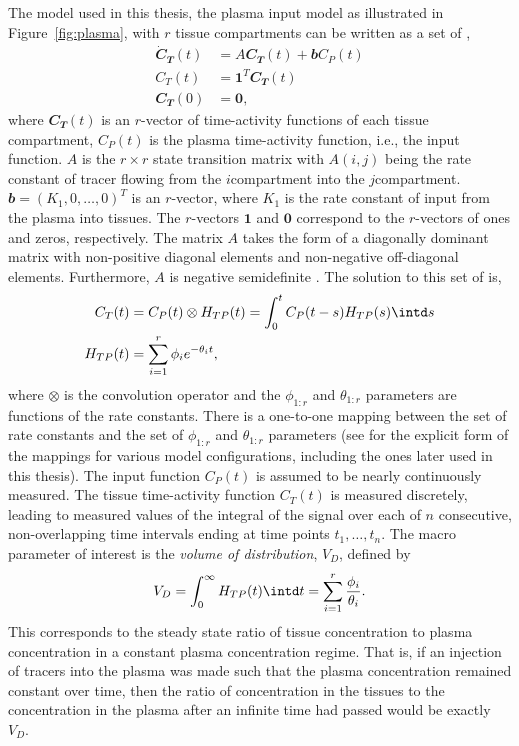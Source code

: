 The model used in this thesis, the plasma input model as illustrated in
Figure~\ref{fig:plasma}, with $r$ tissue compartments can be written as a set
of \ode,
\begin{align*}
  \dot{\mathbfit{C}}_{\mathbfit{T}}(t)
  & = A\mathbfit{C}_{\mathbfit{T}}(t) + \mathbfit{b} C_P(t)\\
  C_T(t)
  & = \mathbf{1}^T\mathbfit{C}_{\mathbfit{T}}(t) \\
  \mathbfit{C}_{\mathbfit{T}}(0) & = \mathbf{0},
\end{align*}
where $\mathbfit{C}_{\mathbfit{T}}(t)$ is an $r$-vector of time-activity
functions of each tissue compartment, $C_P(t)$ is the plasma time-activity
function, i.e., the input function. $A$ is the $r \times r$ state transition
matrix with $A(i,j)$ being the rate constant of tracer flowing from the
$i$\xth compartment into the $j$\xth compartment. $\mathbfit{b} = (K_1, 0,
\dots, 0)^T$ is an $r$-vector, where $K_1$ is the rate constant of input from
the plasma into tissues. The $r$-vectors $\mathbf{1}$ and $\mathbf{0}$
correspond to the $r$-vectors of ones and zeros, respectively. The matrix $A$
takes the form of a diagonally dominant matrix with non-positive diagonal
elements and non-negative off-diagonal elements. Furthermore, $A$ is negative
semidefinite \cite{Gunn:2001cx}. The solution to this set of \ode is,
\begin{align}
  C_T(t) & = C_P(t) \otimes H_{TP}(t) = \int_0^t C_P(t-s) H_{TP}(s)\intd s
  \label{eq:CT} \\
  H_{TP}(t) & = \sum_{i=1}^r \phi_i e^{-\theta_i t},
  \label{eq:HTP}
\end{align}
where $\otimes$ is the convolution operator and the $\phi_{1:r}$ and
$\theta_{1:r}$ parameters are functions of the rate constants. There is a
one-to-one mapping between the set of rate constants and the set of
$\phi_{1:r}$ and $\theta_{1:r}$ parameters (see \cite{Gunn:2001cx} for the
explicit form of the mappings for various model configurations, including the
ones later used in this thesis). The input function $C_P(t)$ is assumed to be
nearly continuously measured. The tissue time-activity function $C_T(t)$ is
measured discretely, leading to measured values of the integral of the signal
over each of $n$ consecutive, non-overlapping time intervals ending at time
points $t_1, \dots, t_n$. The macro parameter of interest is the \emph{volume
of distribution}, $V_D$, defined by
\begin{equation}
  V_D = \int_0^{\infty} H_{TP}(t) \intd t = \sum_{i=1}^r
  \frac{\phi_i}{\theta_i}.
\end{equation}
This corresponds to the steady state ratio of tissue concentration to
plasma concentration in a constant plasma concentration regime. That is, if
an injection of tracers into the plasma was made such that the plasma
concentration remained constant over time, then the ratio of
concentration in the tissues to the concentration in the plasma after an
infinite time had passed would be exactly $V_D$.

